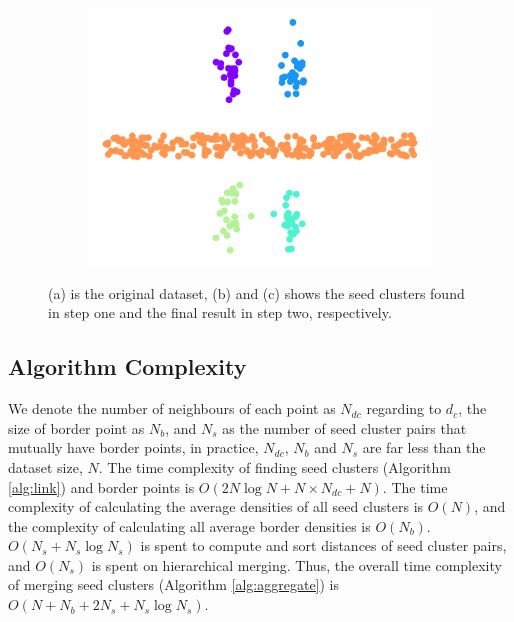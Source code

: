 \documentclass{llncs}
\begin{document}
\begin{figure}[ht]
\begin{subfigure}[t]{0.28\textwidth}
\end{subfigure}
\quad
\begin{subfigure}[t]{0.28\textwidth}
\centering
\includegraphics[width=1\textwidth]{image/correct.png}
\end{subfigure}
\caption{(a) is the original dataset, (b) and (c) shows the seed clusters found in step one and the final result in step two, respectively.}
\label{fig:MDPC}
\end{figure}
%
\subsection{Algorithm Complexity}
We denote the number of neighbours of each point as $N_{dc}$ regarding to $d_{c}$, the size of border point as $N_{b}$, and $N_{s}$ as the number of seed cluster pairs that mutually have border points, in practice, $N_{dc}$, $ N_{b}$ and $N_{s}$ are far less than the dataset size, $N$. The time complexity of finding seed clusters (Algorithm \ref{alg:link}) and border points is $O\left(2N\log{N} + N\times N_{dc} + N\right)$. The time complexity of calculating the average densities of all seed clusters is $O\left(N\right)$, and the complexity of calculating all average border densities is $O\left(N_{b}\right)$. $O\left(N_{s} + N_{s}\log{N_{s}}\right)$ is spent to compute and sort distances of seed cluster pairs, and $O\left(N_{s}\right)$ is spent on hierarchical merging. Thus, the overall time complexity of merging seed clusters (Algorithm \ref{alg:aggregate}) is $O\left(N + N_{b} + 2N_{s} + N_{s}\log{N_{s}}\right)$.
%
\end{document}
